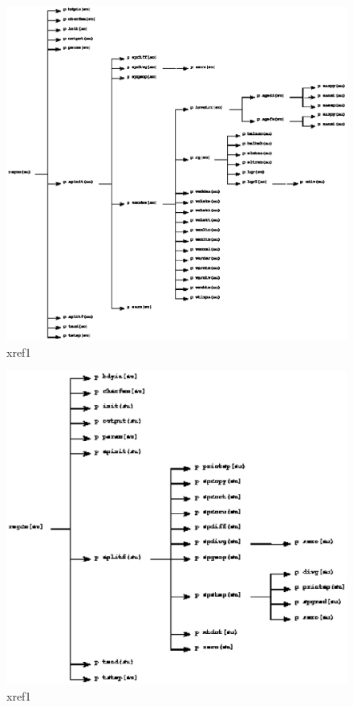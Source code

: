 \begin{figure}
\begin{center}
\hspace{-1cm}
\includegraphics{xref2.fixed.eps}
\caption{xref1}  \label{grid}
\end{center}
\end{figure}

\begin{figure}
\begin{center}
\hspace{-1cm}
\includegraphics{xref3.fixed.eps}
\caption{xref1}  \label{grid}
\end{center}
\end{figure}

